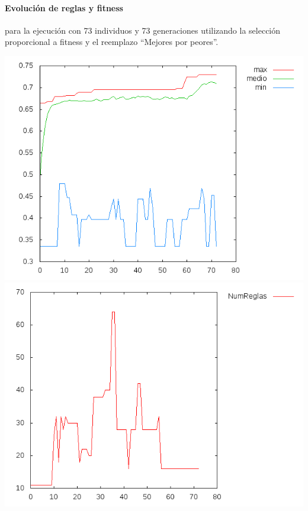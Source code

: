 \documentclass[nochap]{apuntes}
\begin{document}
\paragraph{Evolución de reglas y fitness} para la ejecución con 73 individuos y 73 generaciones utilizando la selección proporcional a fitness y el reemplazo ``Mejores por peores''.

\begin{center}
\includegraphics[scale=0.4]{tex/img/g73_p73_MejoresPorPeores_SeleccionProporcionalAlFitness_reg11.png}
\includegraphics[scale=0.4]{tex/img/g73_p73_MejoresPorPeores_SeleccionProporcionalAlFitness_reg11_reglas.png}
\end{center}
\end{document}
